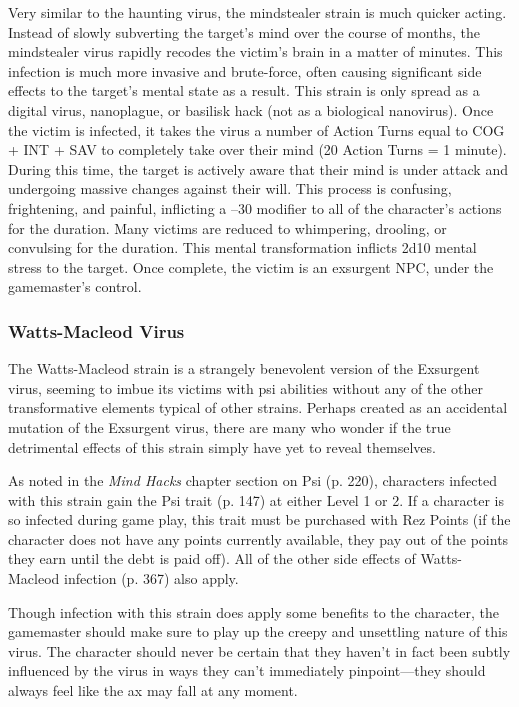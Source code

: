Very similar to the haunting virus, the mindstealer 
strain is much quicker acting. Instead of slowly subverting
the target's mind over the course of months,
the mindstealer virus rapidly recodes the victim's brain 
in a matter of minutes. This infection is much more 
invasive and brute-force, often causing significant 
side effects to the target's mental state as a result. This 
strain is only spread as a digital virus, nanoplague, or 
basilisk hack (not as a biological nanovirus).
Once the victim is infected, it takes the virus a 
number of Action Turns equal to COG + INT + SAV 
to completely take over their mind (20 Action Turns 
= 1 minute). During this time, the target is actively 
aware that their mind is under attack and undergoing
massive changes against their will. This process
is confusing, frightening, and painful, inflicting  a 
–30 modifier to all of the character's actions for the 
duration. Many victims are reduced to whimpering, 
drooling, or convulsing for the duration.
This mental transformation inflicts 2d10 mental 
stress to the target. Once complete, the victim is an 
exsurgent NPC, under the gamemaster's control. 

\subsubsection{Watts-Macleod Virus}

The Watts-Macleod strain is a strangely benevolent 
version of the Exsurgent virus, seeming to imbue its 
victims with psi abilities without any of the other 
transformative elements typical of other strains. 
Perhaps created as an accidental mutation of the Exsurgent
virus, there are many who wonder if the true
detrimental effects of this strain simply have yet to 
reveal themselves.

As noted in the \textit{Mind Hacks} chapter section on Psi 
(p. 220), characters infected with this strain gain the 
Psi trait (p. 147) at either Level 1 or 2. If a character 
is so infected during game play, this trait must be 
purchased with Rez Points (if the character does not 
have any points currently available, they pay out of 
the points they earn until the debt is paid off). All of 
the other side effects of Watts-Macleod infection (p. 
367) also apply.

Though infection with this strain does apply some 
benefits to the character, the gamemaster should make 
sure to play up the creepy and unsettling nature of 
this virus. The character should never be certain that 
they haven't in fact been subtly influenced by the virus 
in ways they can't immediately pinpoint—they should 
always feel like the ax may fall at any moment.

